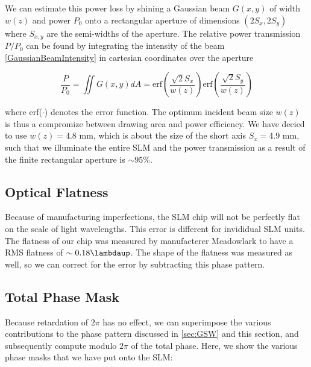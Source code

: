 We can estimate this power loss by shining a Gaussian beam $G(x,y)$ of width $w(z)$ and power $P_0$ onto a rectangular aperture of dimensions $(2S_x, 2S_y)$ where $S_{x,y}$ are the semi-widths of the aperture. The relative power transmission $P/P_0$ can be found by integrating the intensity of the beam \cref{GaussianBeamIntensity} in cartesian coordinates over the aperture

\begin{equation}\label{RectAperturePower}
    \frac{P}{P_0} =
    \iint G(x,y) dA=
    \text{erf}\left(\frac{\sqrt{2}S_x}{w(z)}\right) \text{erf}\left(\frac{\sqrt{2}S_y}{w(z)}\right)
\end{equation}

where erf($\cdot$) denotes the error function. The optimum incident beam size $w(z)$ is thus a compromize between drawing area and power efficiency. We have decied to use $w(z) = 4.8$ mm, which is about the size of the short axis $S_x = 4.9$ mm, such that we illuminate the entire \ac{SLM} and the power transmission as a result of the finite rectangular aperture is $\sim 95$\%.

\subsection{Optical Flatness}\label{subsec:Flatness}

Because of manufacturing imperfections, the SLM chip will not be perfectly flat on the scale of light wavelengths. This error is different for invididual SLM units. The flatness of our chip was measured by manufacterer Meadowlark to have a RMS flatness of $\sim 0.18\lambdaup$. The shape of the flatness was measured as well, so we can correct for the error by subtracting this phase pattern. 

\subsection{Total Phase Mask}

Because retardation of $2\pi$ has no effect, we can superimpose the various contributions to the phase pattern discussed in \cref{sec:GSW} and this section, and subsequently compute modulo $2\pi$ of the total phase. Here, we show the various phase masks that we have put onto the SLM:

